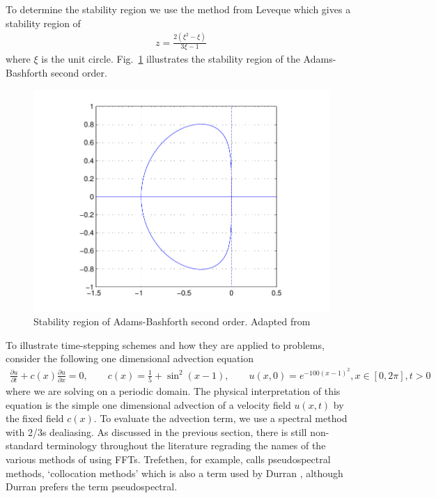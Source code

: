 To determine the stability region we use the method from Leveque \cite{leveque} which gives a stability region of
\begin{align}
z = \frac{2(\xi^{2}-\xi)}{3\xi -1}
\end{align}
where $\xi$ is the unit circle. Fig.~\ref{ab_stab} illustrates the stability region of the Adams-Bashforth second order.
\begin{figure}
\begin{center}
\includegraphics[width=\textwidth]{ab_stab}
\caption{Stability region of Adams-Bashforth second order. Adapted from \cite{trefethen_spectral}}
\label{ab_stab}
\end{center}
\end{figure}

To illustrate time-stepping schemes and how they are applied to problems, consider the following one dimensional advection equation\cite{trefethen_spectral}
\begin{align}
\frac{\partial u}{\partial t} + c(x)\frac{\partial u}{\partial x} = 0,\qquad c(x)=\frac{1}{5}+\sin^{2}(x-1), \qquad u(x,0)=e^{-100(x-1)^{2}}, x\in[0,2\pi], t>0
\end{align}
where we are solving on a periodic domain. The physical interpretation of this equation is the simple one dimensional advection of a velocity field $u(x,t)$ by the fixed field $c(x)$. To evaluate the advection term, we use a spectral method with 2/3s dealiasing. As discussed in the previous section, there is still non-standard terminology throughout the literature regrading the names of the various methods of using FFTs. Trefethen, for example, calls pseudospectral methods, `collocation methods'\cite{trefethen_spectral} which is also a term used by Durran \cite{durran}, although Durran prefers the term pseudospectral.  

